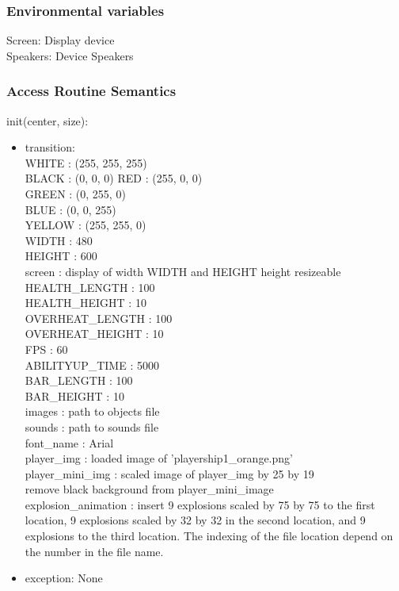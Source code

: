 \documentclass[12pt, titlepage]{article}
\begin{document}
\subsubsection {Environmental variables}
Screen: Display device\\
Speakers: Device Speakers

\subsubsection {Access Routine Semantics}

\noindent init(center, size): 
\begin{itemize}
	\item transition:\\
	WHITE : (255, 255, 255)\\
	BLACK : (0, 0, 0)
	RED : (255, 0, 0)\\
	GREEN : (0, 255, 0)\\
	BLUE : (0, 0, 255)\\
	YELLOW : (255, 255, 0)\\
	WIDTH : 480\\
	HEIGHT : 600\\
	screen : display of width WIDTH and HEIGHT height resizeable\\
	HEALTH\_LENGTH : 100\\
	HEALTH\_HEIGHT : 10\\
	OVERHEAT\_LENGTH : 100\\
	OVERHEAT\_HEIGHT : 10\\
	FPS : 60\\
	ABILITYUP\_TIME : 5000\\
	BAR\_LENGTH : 100\\
	BAR\_HEIGHT : 10\\
	images : path to objects file\\
	sounds : path to sounds file\\
	font\_name : Arial\\
	player\_img : loaded image of 'playership1\_orange.png'\\
	player\_mini\_img : scaled image of player\_img by 25 by 19\\
	remove black background from player\_mini\_image\\
	explosion\_animation : insert 9 explosions scaled by 75 by 75 to the first location, 9 explosions scaled by 32 by 32 in the second location, and 9 explosions to the third location. The indexing of the file location depend on the number in the file name.\\
	
	\item exception: None
	
\end{itemize}
\end{document}
